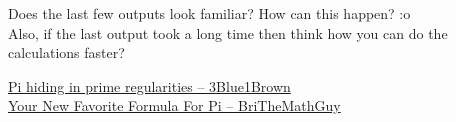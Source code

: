 \documentclass[../../Problems]{subfiles}
\begin{document}
\begin{noteI}
Does the last few outputs look familiar? How can this happen? :o\\
Also, if the last output took a long time then think how you can do the calculations faster?
\end{noteI}
\begin{funvideo}
\href{https://youtu.be/NaL_Cb42WyY}{Pi hiding in prime regularities -- 3Blue1Brown}\\
\href{https://youtu.be/VftM4LpTrkI}{Your New Favorite Formula For Pi -- BriTheMathGuy}
\end{funvideo}
\end{document}
